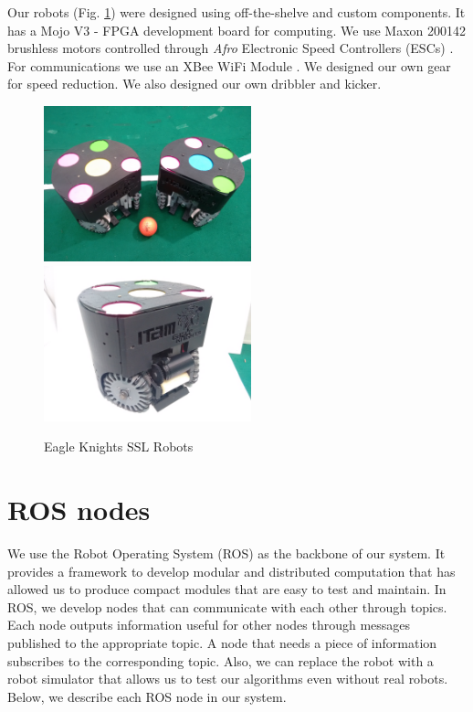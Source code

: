 \documentclass[]{llncs}
\newcommand{\TODO}[1]{{\textcolor{blue}{ToDo: {#1}}}}
\begin{document}
Our robots (Fig. \ref{fig:two-ekbots}) were designed using
off-the-shelve and custom components. It has a Mojo V3 - FPGA development board \cite{embedded micro} for computing. We use Maxon 200142 brushless motors \cite{maxon_motor} controlled through \emph{Afro} Electronic Speed Controllers (ESCs) \cite{esc_afro}. For communications we use an XBee WiFi Module \cite{xbee_wifi}. We designed our own gear for speed reduction. We also designed our own dribbler and kicker. 


\begin{figure}[htb]
	\centering
	\includegraphics[width=6cm]{./pictures/two_ekbots.jpg}
	\includegraphics[width=6cm]{./pictures/ekbot_front.jpg}
	\caption{Eagle Knights SSL Robots}
	\label{fig:two-ekbots}  
\end{figure}


\section{ROS nodes}

We use the Robot Operating System (ROS) as the backbone of our system. It provides a framework to develop modular and distributed computation that has allowed us to produce compact modules that are easy to test and maintain. In ROS, we develop nodes that can communicate with each other through topics. Each node outputs information useful for other nodes through messages published to the appropriate topic. A node that needs a piece of information subscribes to the corresponding topic. Also, we can replace the robot with a robot simulator that allows us to test our algorithms even without real robots. Below, we describe each ROS node in our system.
\end{document}
